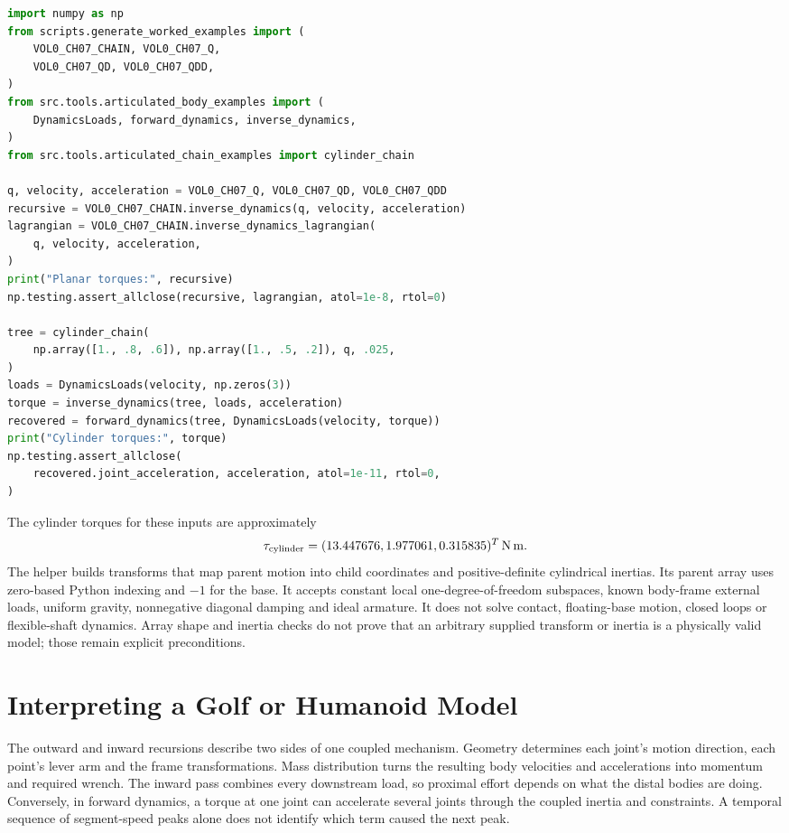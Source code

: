 \clearpage
\begin{lstlisting}[language=Python,basicstyle=\ttfamily\small]
import numpy as np
from scripts.generate_worked_examples import (
    VOL0_CH07_CHAIN, VOL0_CH07_Q,
    VOL0_CH07_QD, VOL0_CH07_QDD,
)
from src.tools.articulated_body_examples import (
    DynamicsLoads, forward_dynamics, inverse_dynamics,
)
from src.tools.articulated_chain_examples import cylinder_chain

q, velocity, acceleration = VOL0_CH07_Q, VOL0_CH07_QD, VOL0_CH07_QDD
recursive = VOL0_CH07_CHAIN.inverse_dynamics(q, velocity, acceleration)
lagrangian = VOL0_CH07_CHAIN.inverse_dynamics_lagrangian(
    q, velocity, acceleration,
)
print("Planar torques:", recursive)
np.testing.assert_allclose(recursive, lagrangian, atol=1e-8, rtol=0)

tree = cylinder_chain(
    np.array([1., .8, .6]), np.array([1., .5, .2]), q, .025,
)
loads = DynamicsLoads(velocity, np.zeros(3))
torque = inverse_dynamics(tree, loads, acceleration)
recovered = forward_dynamics(tree, DynamicsLoads(velocity, torque))
print("Cylinder torques:", torque)
np.testing.assert_allclose(
    recovered.joint_acceleration, acceleration, atol=1e-11, rtol=0,
)
\end{lstlisting}

The cylinder torques for these inputs are approximately
\begin{equation}
 \tau_{\rm cylinder}=(13.447676,1.977061,0.315835)^T\,\mathrm{N\,m}.
 \label{eq:rnea_cylinder_torques}
\end{equation}
 The helper builds transforms that map parent motion into child coordinates and positive-definite cylindrical inertias. Its parent array uses zero-based Python indexing and $-1$ for the base. It accepts constant local one-degree-of-freedom subspaces, known body-frame external loads, uniform gravity, nonnegative diagonal damping and ideal armature. It does not solve contact, floating-base motion, closed loops or flexible-shaft dynamics. Array shape and inertia checks do not prove that an arbitrary supplied transform or inertia is a physically valid model; those remain explicit preconditions.

\section{Interpreting a Golf or Humanoid Model}
\label{sec:ch7_summary}

The outward and inward recursions describe two sides of one coupled mechanism. Geometry determines each joint's motion direction, each point's lever arm and the frame transformations. Mass distribution turns the resulting body velocities and accelerations into momentum and required wrench. The inward pass combines every downstream load, so proximal effort depends on what the distal bodies are doing. Conversely, in forward dynamics, a torque at one joint can accelerate several joints through the coupled inertia and constraints. A temporal sequence of segment-speed peaks alone does not identify which term caused the next peak.

